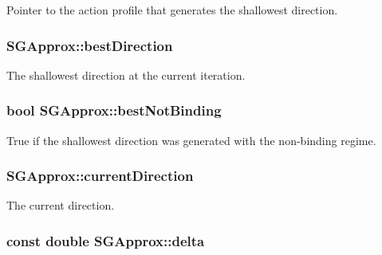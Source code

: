 Pointer to the action profile that generates the shallowest direction. \hypertarget{classSGApprox_a20454173d5c9af9bd24870d97f4e2b91}{
\subsubsection[{best\-Direction}]{ S\-G\-Approx\-::best\-Direction\hspace{0.3cm}{\ttfamily [private]}}}\label{classSGApprox_a20454173d5c9af9bd24870d97f4e2b91}
The shallowest direction at the current iteration. \hypertarget{classSGApprox_ac1a670470711fd81c00aba76d8213ade}{
\subsubsection[{best\-Not\-Binding}]{\setlength{\rightskip}{0pt plus 5cm}bool S\-G\-Approx\-::best\-Not\-Binding\hspace{0.3cm}{\ttfamily [private]}}}\label{classSGApprox_ac1a670470711fd81c00aba76d8213ade}
True if the shallowest direction was generated with the non-\/binding regime. \hypertarget{classSGApprox_ac5bf5f2eba2d65c8a9933b6d74f0cd47}{
\subsubsection[{current\-Direction}]{ S\-G\-Approx\-::current\-Direction\hspace{0.3cm}{\ttfamily [private]}}}\label{classSGApprox_ac5bf5f2eba2d65c8a9933b6d74f0cd47}
The current direction. \hypertarget{classSGApprox_ad105b178e4e85845ce5a85e26d7d038b}{
\subsubsection[{delta}]{\setlength{\rightskip}{0pt plus 5cm}const double S\-G\-Approx\-::delta\hspace{0.3cm}{\ttfamily [private]}}}\label{classSGApprox_ad105b178e4e85845ce5a85e26d7d038b}
